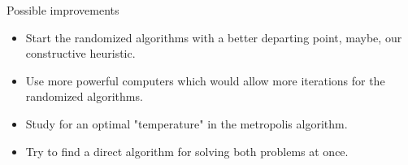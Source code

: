 \documentclass[newPxFont]{beamer}
\begin{document}
\begin{frame}{Possible improvements}
\vspace{-2em}
\begin{itemize}
\item Start the randomized algorithms with a better departing point, maybe, our constructive heuristic.
\item Use more powerful computers which would allow more iterations for the randomized algorithms.
\item Study for an optimal "temperature" in the metropolis algorithm.
\item Try to find a direct algorithm for solving both problems at once.
\end{itemize}
\end{frame}
\end{document}
